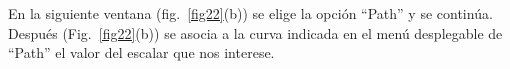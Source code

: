 \documentclass[spanish,a4paper,12pt]{article}
\begin{document}
\begin{enumerate}
En la siguiente ventana (fig.~\ref{fig22}(b)) se elige la opción ``Path'' y se continúa.
Después (Fig.~\ref{fig22}(b)) se asocia a la curva indicada en el menú desplegable de ``Path'' el valor del escalar que nos interese. 
\begin{figure}[h!tp]
\centering
	\quad

\end{figure}
\end{enumerate}
\end{document}
